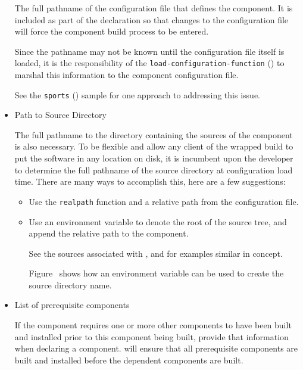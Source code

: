 \begin{itemize}
  The full pathname of the configuration file that defines the
  component.  It is included as part of the declaration so that
  changes to the configuration file will force the component build
  process to be entered.

  Since the pathname may not be known until the configuration file
  itself is loaded, it is the responsibility of the
  \texttt{load-configuration-function}
  () to marshal this
  information to the component configuration file.

  See the \texttt{sports} () sample for one
  approach to addressing this issue.

\item{Path to Source Directory}

  The full pathname to the directory containing the sources of the
  component is also necessary.  To be flexible and allow any client of
  the wrapped build to put the software in any location on disk, it is
  incumbent upon the developer to determine the full pathname of the
  source directory at configuration load time.  There are many ways to
  accomplish this, here are a few suggestions:

  \begin{itemize}
    \item Use the \gnumake \texttt{realpath} function and a relative path from
      the configuration file.
    \item Use an environment variable to denote the root of the source
      tree, and append the relative path to the component.

      See the sources associated with ,
       and  for examples
      similar in concept.

      Figure~ shows how an
      environment variable can be used to create the source directory
      name.
  \end{itemize}

\item{List of prerequisite components}

  If the component requires one or more other components to have been
  built and installed prior to this component being built, provide
  that information when declaring a component.  \lmsbw will ensure
  that all prerequisite components are built and installed before the
  dependent components are built.
\end{itemize}

